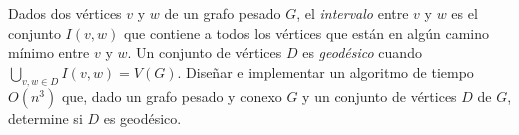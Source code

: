 
 \item Dados dos vértices $v$ y $w$ de un grafo pesado $G$, el \emph{intervalo} entre $v$ y $w$ es el conjunto $I(v,w)$ que contiene a todos los vértices que están en algún camino mínimo entre $v$ y $w$.  Un conjunto de vértices $D$ es \emph{geodésico} cuando $\bigcup_{v,w \in D} I(v,w) = V(G)$. Diseñar e implementar un algoritmo de tiempo $O(n^3)$ que, dado un grafo pesado y conexo $G$ y un conjunto de vértices $D$ de $G$, determine si $D$ es geodésico.



